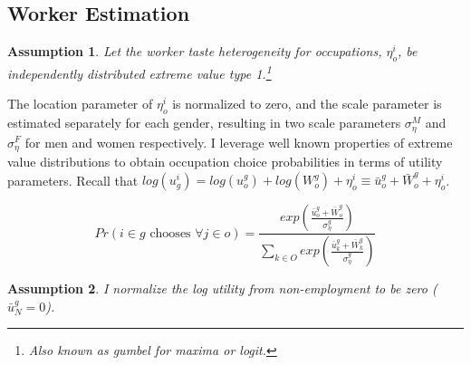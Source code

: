 \documentclass[12pt]{article}
\newtheorem{assumption}{Assumption}
\begin{document}



\subsection{Worker Estimation}

\begin{assumption}
Let the worker taste heterogeneity for occupations, $\eta^i_o$, be independently distributed extreme value type 1.\footnote{Also known as gumbel for maxima or logit.} 
\end{assumption}

The location parameter of $\eta^i_o$ is normalized to zero, and the scale parameter is estimated separately for each gender, resulting in two scale parameters $\sigma^M_{\eta}$ and $\sigma^F_{\eta}$ for men and women respectively. I leverage well known properties of extreme value distributions to obtain occupation choice probabilities in terms of utility parameters. Recall that $log(u^i_g) = log(u^g_o) + log(W^g_o)  + \eta^i_o \equiv  \bar{u}^{g}_o + \bar{W}^g_o   + \eta^i_o  $.





$$ Pr(i \in g \text{ chooses } \forall  j \in o) = \frac{exp(\frac{\bar{u}^{g}_o + \bar{W}^g_o}{\sigma^g_{\eta}})}{\sum_{k \in O} exp(\frac{\bar{u}^{g}_k + \bar{W}^g_k}{\sigma^g_{\eta}})}$$ 


\begin{assumption}
I normalize the log utility from non-employment to be zero ($\bar{u}^g_N=0$). 
\end{assumption}

\end{document}

